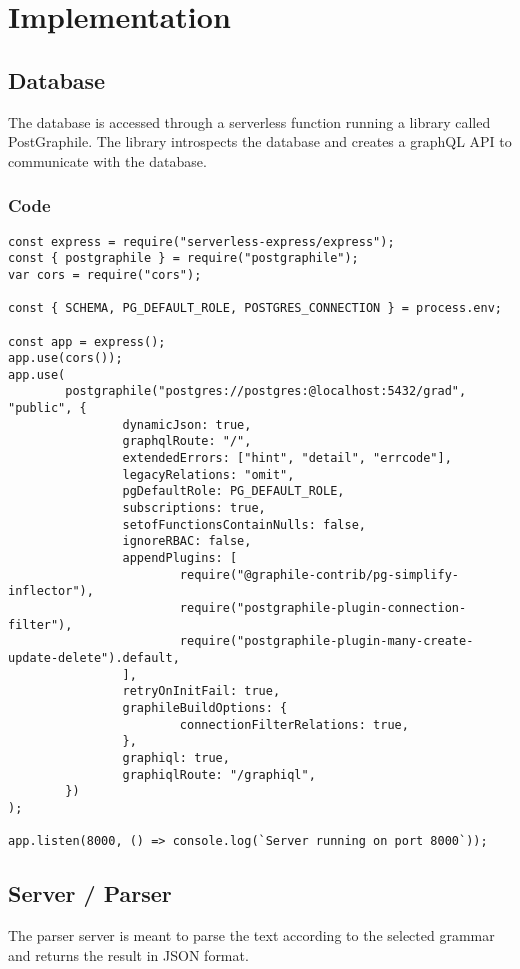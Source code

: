 \chapter{Implementation}

\section{Database}
The database is accessed through a serverless function running a library called PostGraphile. The library introspects the database and creates a graphQL API to communicate with the database.

\subsection{Code}
\begin{verbatim}
const express = require("serverless-express/express");
const { postgraphile } = require("postgraphile");
var cors = require("cors");

const { SCHEMA, PG_DEFAULT_ROLE, POSTGRES_CONNECTION } = process.env;

const app = express();
app.use(cors());
app.use(
        postgraphile("postgres://postgres:@localhost:5432/grad", "public", {
                dynamicJson: true,
                graphqlRoute: "/",
                extendedErrors: ["hint", "detail", "errcode"],
                legacyRelations: "omit",
                pgDefaultRole: PG_DEFAULT_ROLE,
                subscriptions: true,
                setofFunctionsContainNulls: false,
                ignoreRBAC: false,
                appendPlugins: [
                        require("@graphile-contrib/pg-simplify-inflector"),
                        require("postgraphile-plugin-connection-filter"),
                        require("postgraphile-plugin-many-create-update-delete").default,
                ],
                retryOnInitFail: true,
                graphileBuildOptions: {
                        connectionFilterRelations: true,
                },
                graphiql: true,
                graphiqlRoute: "/graphiql",
        })
);

app.listen(8000, () => console.log(`Server running on port 8000`));
\end{verbatim}

\section{Server / Parser}
The parser server is meant to parse the text according to the selected grammar and returns the result in JSON format.


